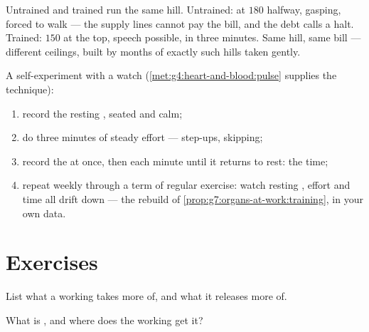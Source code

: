 \begin{example}\label{ex:g7:organs-at-work:runners}
Untrained and trained run the same hill. Untrained: 
at $180$ halfway, gasping, forced to walk --- the supply
lines cannot pay the bill, and the debt calls a halt.
Trained:  $150$ at the top, speech possible, 
in three minutes. Same hill, same bill --- different
ceilings, built by months of exactly such hills taken
gently.
\end{example}

\begin{method}\label{met:g7:organs-at-work:read}
A self-experiment with a watch
(\cref{met:g4:heart-and-blood:pulse} supplies the 
technique):
\begin{enumerate}
  \item record the resting , seated and calm;
  \item do three minutes of steady effort --- step-ups,
        skipping;
  \item record the  at once, then each minute until
        it returns to rest: the  time;
  \item repeat weekly through a term of regular exercise:
        watch resting , effort  and 
        time all drift down --- the rebuild of
        \cref{prop:g7:organs-at-work:training}, in your
        own data.
\end{enumerate}
\end{method}

\section{Exercises}

\begin{exercise}[$\star$]\label{exo:g7:organs-at-work:1}
List what a working  takes more of, and what it
releases more of.
\end{exercise}

\begin{exercise}[$\star$]\label{exo:g7:organs-at-work:2}
What is , and where does the working  get it?
\end{exercise}

